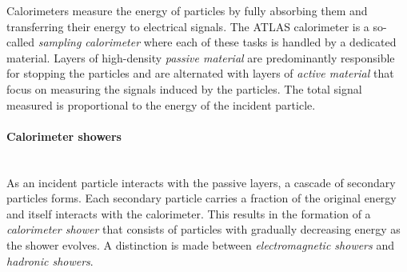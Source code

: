 Calorimeters measure the energy of particles by fully absorbing them and transferring their energy to electrical signals.
The ATLAS calorimeter is a so-called \emph{sampling calorimeter} where each of these tasks is handled by a dedicated material.
Layers of high-density \emph{passive material} are predominantly responsible for stopping the particles and are alternated with layers of \emph{active material} that focus on measuring the signals induced by the particles.
The total signal measured is proportional to the energy of the incident particle.



\paragraph{Calorimeter showers}\mbox{}\\
As an incident particle interacts with the passive layers, a cascade of secondary particles forms.
Each secondary particle carries a fraction of the original energy and itself interacts with the calorimeter. This results in the formation of a \emph{calorimeter shower} that consists of particles with gradually decreasing energy as the shower evolves.
A distinction is made between \emph{electromagnetic showers} and \emph{hadronic showers}.

